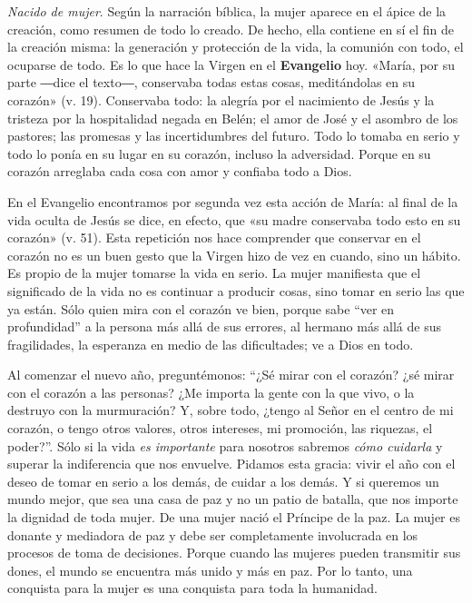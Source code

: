 \documentclass[]{article}
\begin{document}
\emph{Nacido de mujer}. Según la narración bíblica, la mujer aparece en
el ápice de la creación, como resumen de todo lo creado. De hecho, ella
contiene en sí el fin de la creación misma: la generación y protección
de la vida, la comunión con todo, el ocuparse de todo. Es lo que hace la
Virgen en el \textbf{Evangelio} hoy. «María, por su parte ―dice el
texto―, conservaba todas estas cosas, meditándolas en su corazón» (v.
19). Conservaba todo: la alegría por el nacimiento de Jesús y la
tristeza por la hospitalidad negada en Belén; el amor de José y el
asombro de los pastores; las promesas y las incertidumbres del futuro.
Todo lo tomaba en serio y todo lo ponía en su lugar en su corazón,
incluso la adversidad. Porque en su corazón arreglaba cada cosa con amor
y confiaba todo a Dios.

En el Evangelio encontramos por segunda vez esta acción de María: al
final de la vida oculta de Jesús se dice, en efecto, que «su madre
conservaba todo esto en su corazón» (v. 51). Esta repetición nos hace
comprender que conservar en el corazón no es un buen gesto que la Virgen
hizo de vez en cuando, sino un hábito. Es propio de la mujer tomarse la
vida en serio. La mujer manifiesta que el significado de la vida no es
continuar a producir cosas, sino tomar en serio las que ya están. Sólo
quien mira con el corazón ve bien, porque sabe ``ver en profundidad'' a
la persona más allá de sus errores, al hermano más allá de sus
fragilidades, la esperanza en medio de las dificultades; ve a Dios en
todo.

Al comenzar el nuevo año, preguntémonos: ``¿Sé mirar con el corazón? ¿sé
mirar con el corazón a las personas? ¿Me importa la gente con la que
vivo, o la destruyo con la murmuración? Y, sobre todo, ¿tengo al Señor
en el centro de mi corazón, o tengo otros valores, otros intereses, mi
promoción, las riquezas, el poder?''. Sólo si la vida \emph{es
importante} para nosotros sabremos \emph{cómo cuidarla} y superar la
indiferencia que nos envuelve. Pidamos esta gracia: vivir el año con el
deseo de tomar en serio a los demás, de cuidar a los demás. Y si
queremos un mundo mejor, que sea una casa de paz y no un patio de
batalla, que nos importe la dignidad de toda mujer. De una mujer nació
el Príncipe de la paz. La mujer es donante y mediadora de paz y debe ser
completamente involucrada en los procesos de toma de decisiones. Porque
cuando las mujeres pueden transmitir sus dones, el mundo se encuentra
más unido y más en paz. Por lo tanto, una conquista para la mujer es una
conquista para toda la humanidad.
\end{document}
